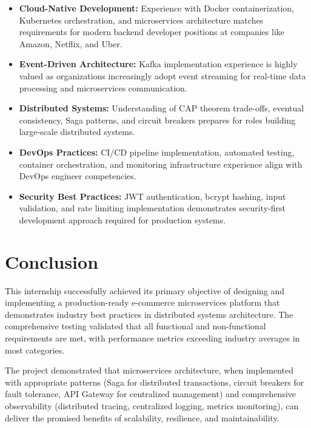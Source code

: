 \begin{itemize}
    \item \textbf{Cloud-Native Development:} Experience with Docker containerization, Kubernetes orchestration, and microservices architecture matches requirements for modern backend developer positions at companies like Amazon, Netflix, and Uber.
    
    \item \textbf{Event-Driven Architecture:} Kafka implementation experience is highly valued as organizations increasingly adopt event streaming for real-time data processing and microservices communication.
    
    \item \textbf{Distributed Systems:} Understanding of CAP theorem trade-offs, eventual consistency, Saga patterns, and circuit breakers prepares for roles building large-scale distributed systems.
    
    \item \textbf{DevOps Practices:} CI/CD pipeline implementation, automated testing, container orchestration, and monitoring infrastructure experience align with DevOps engineer competencies.
    
    \item \textbf{Security Best Practices:} JWT authentication, bcrypt hashing, input validation, and rate limiting implementation demonstrates security-first development approach required for production systems.
\end{itemize}

\section{Conclusion}

This internship successfully achieved its primary objective of designing and implementing a production-ready e-commerce microservices platform that demonstrates industry best practices in distributed systems architecture. The comprehensive testing validated that all functional and non-functional requirements are met, with performance metrics exceeding industry averages in most categories.

The project demonstrated that microservices architecture, when implemented with appropriate patterns (Saga for distributed transactions, circuit breakers for fault tolerance, API Gateway for centralized management) and comprehensive observability (distributed tracing, centralized logging, metrics monitoring), can deliver the promised benefits of scalability, resilience, and maintainability.

